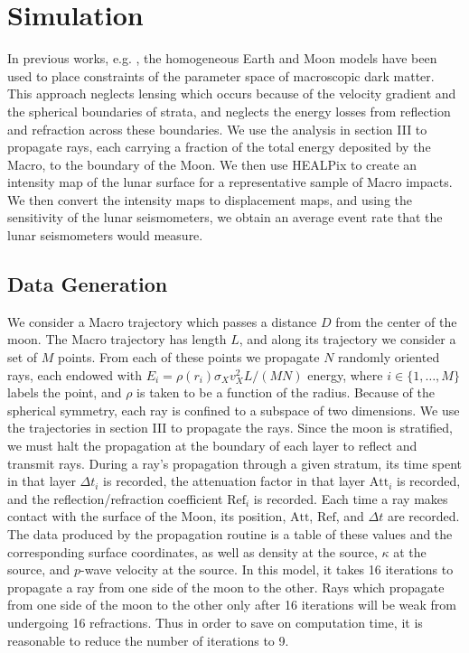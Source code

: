 \documentclass[prd,reprint,10pt]{revtex4-1}
\newcommand*\te[1]{\text{#1}}
\begin{document}
\section{Simulation}
In previous works, e.g. \cite{banerdt2005seismic}, the homogeneous Earth and Moon models have been used to place constraints of the parameter space of macroscopic dark matter. This approach neglects lensing which occurs because of the velocity gradient and the spherical boundaries of strata, and neglects the energy losses from reflection and refraction across these boundaries. We use the analysis in section III to propagate rays, each carrying a fraction of the total energy deposited by the Macro, to the boundary of the Moon. We then use HEALPix to create an intensity map of the lunar surface for a representative sample of Macro impacts. We then convert the intensity maps to displacement maps, and using the sensitivity of the lunar seismometers, we obtain an average event rate that the lunar seismometers would measure.
\subsection{Data Generation}
We consider a Macro trajectory which passes a distance $D$ from the center of the moon. The Macro trajectory has length $L$, and along its trajectory we consider a set of $M$ points. From each of these points we propagate $N$ randomly oriented rays, each endowed with $E_i = \rho(r_{i})\sigma_Xv_X^2 L/(MN)$ energy, where $i\in\{1,\dots,M\}$ labels the point, and $\rho$ is taken to be a function of the radius. Because of the spherical symmetry, each ray is confined to a subspace of two dimensions. We use the trajectories in section III to propagate the rays. Since the moon is stratified, we must halt the propagation at the boundary of each layer to reflect and transmit rays. During a ray's propagation through a given stratum, its time spent in that layer $\Delta t_i$ is recorded, the attenuation factor in that layer $\te{Att}_i$ is recorded, and the reflection/refraction coefficient $\te{Ref}_i$ is recorded. Each time a ray makes contact with the surface of the Moon, its position, $\te{Att}$, $\te{Ref}$, and $\Delta t$ are recorded. The data produced by the propagation routine is a table of these values and the corresponding surface coordinates, as well as density at the source, $\kappa$ at the source, and $p$-wave velocity at the source. In this model, it takes 16 iterations to propagate a ray from one side of the moon to the other. Rays which propagate from one side of the moon to the other only after 16 iterations will be weak from undergoing 16 refractions. Thus in order to save on computation time, it is reasonable to reduce the number of iterations to 9.
\end{document}
